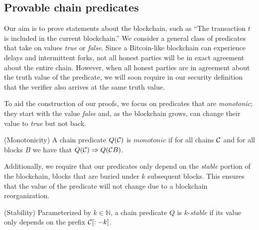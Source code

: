 \subsection{Provable chain predicates}

Our aim is to prove statements about the blockchain, such as ``The transaction
$t$ is included in the current blockchain.'' We consider a general class of
predicates that take on values \emph{true} or \emph{false}.  Since a
Bitcoin-like blockchain can experience delays and intermittent forks, not all
honest parties will be in exact agreement about the entire chain. However, when
all honest parties are in agreement about the truth value of the predicate, we
will soon require in our security definition that the verifier also arrives at
the same truth value.

To aid the construction of our proofs, we focus on predicates that are
\emph{monotonic}; they start with the value \emph{false} and, as the blockchain
grows, can change their value to \emph{true} but not back.

\begin{definition}{(Monotonicity)}
    A chain predicate $Q(\mathcal{C})$ is $\textit{monotonic}$ if for all chains
    $\mathcal{C}$ and for all blocks $B$ we have that
    $Q(\mathcal{C}) \Rightarrow Q(\mathcal{C} B)$.
\end{definition}

Additionally, we require that our predicates only depend on the \emph{stable}
portion of the blockchain, blocks that are buried under $k$ subsequent blocks.
This ensures that the value of the predicate will not change due to a blockchain
reorganization.

\begin{definition}{(Stability)}
    Parameterized by $k \in \mathbb{N}$, a chain predicate $Q$ is
    $k$-\emph{stable} if its value only depends on the prefix $\mathcal{C}[:-k]$.
\end{definition}
